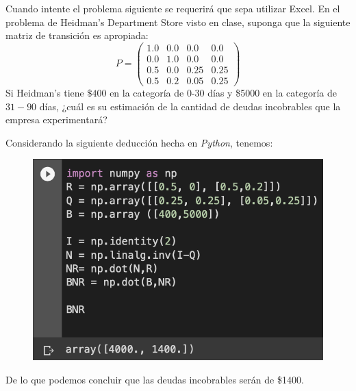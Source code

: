 \begin{problema}
	Cuando intente el problema siguiente se requerirá que sepa utilizar Excel.
	En el problema de Heidman's Department Store visto en clase, suponga que la siguiente matriz de transición es apropiada:
	$$
	P=\left(\begin{array}{cccc}
		1.0 & 0.0 & 0.0 & 0.0 \\
		0.0 & 1.0 & 0.0 & 0.0 \\
		0.5 & 0.0 & 0.25 & 0.25 \\
		0.5 & 0.2 & 0.05 & 0.25
	\end{array}\right)
	$$
	Si Heidman's tiene $\$ 400$ en la categoría de 0-30 días y \$5000 en la categoría de $31-90$ días, ¿cuál es su estimación de la cantidad de deudas incobrables que la empresa experimentará?
	\begin{sol}
		Considerando la siguiente deducción hecha en \textit{Python}, tenemos: 
		\begin{figure}[H]
			\centering
			\includegraphics[scale=0.5]{Images/3}
		\end{figure}
	De lo que podemos concluir que las deudas incobrables serán de \$1400. 
	\end{sol}
\end{problema}

%
%

